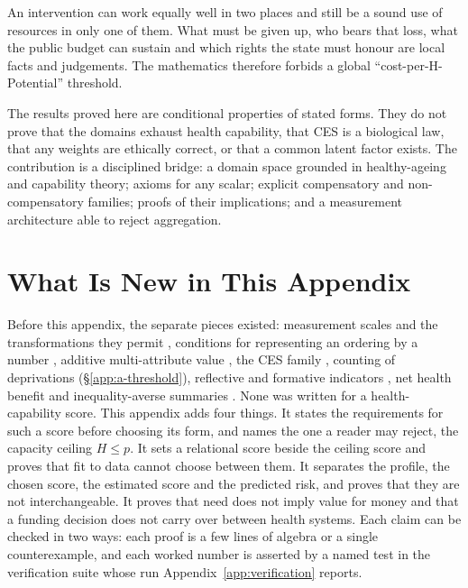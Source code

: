 \begin{remark}
An intervention can work equally well in two places and still be a sound use of
resources in only one of them. What must be given up, who bears that loss, what
the public budget can sustain and which rights the state must honour are local
facts and judgements. The mathematics therefore forbids a global
``cost-per-H-Potential'' threshold.
\end{remark}

The results proved here are conditional properties of stated forms. They do not
prove that the domains exhaust health capability, that CES is a biological law,
that any weights are ethically correct, or that a common latent factor exists.
The contribution is a disciplined bridge: a domain space grounded in
healthy-ageing and capability theory; axioms for any scalar; explicit
compensatory and non-compensatory families; proofs of their implications; and a
measurement architecture able to reject aggregation.


\section*{What Is New in This Appendix}

Before this appendix, the separate pieces existed: measurement scales and the
transformations they permit \citep{stevens_1946}, conditions for representing
an ordering by a number \citep{debreu_1954}, additive multi-attribute value
\citep{keeney_raiffa_1976}, the CES family \citep{arrow_chenery_1961}, counting
of deprivations (\S\ref{app:a-threshold}), reflective and formative indicators
\citep{bollen_lennox_1991,jarvis_2003}, net health benefit
\citep{stinnett_mullahy_1998} and inequality-averse summaries
\citep{atkinson_1970}. None was written for a health-capability score.
This appendix adds four things.
It states the requirements for such a score before choosing its form, and names
the one a reader may reject, the capacity ceiling $H\le p$. It sets a relational
score beside the ceiling score and proves that fit to data cannot choose between
them. It separates the profile, the chosen score, the estimated score and the
predicted risk, and proves that they are not interchangeable. It proves that
need does not imply value for money and that a funding decision does not carry
over between health systems. Each claim can be checked in two ways: each proof
is a few lines of algebra or a single counterexample, and each worked number is
asserted by a named test in the verification suite whose run
Appendix~\ref{app:verification} reports.
